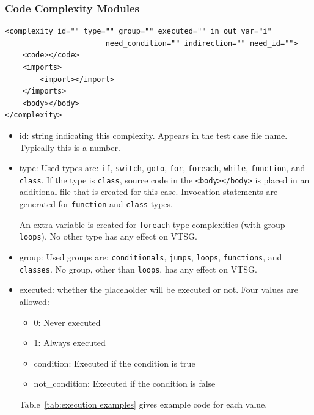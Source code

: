 \subsubsection{Code Complexity Modules}
\label{sec: complexity modules}

\begin{verbatim}
<complexity id="" type="" group="" executed="" in_out_var="i" 
                       need_condition="" indirection="" need_id="">
    <code></code>
    <imports>
        <import></import>
    </imports>
    <body></body>
</complexity>
\end{verbatim}

\begin{itemize}
    \item id: string indicating this complexity.  Appears in the test case
      file name.  Typically this is a number.

    \item type: Used types are: \verb|if|, \verb|switch|, \verb|goto|,
    \verb|for|, \verb|foreach|, \verb|while|,
    \verb|function|, and \verb|class|.
    If the type is \verb|class|, source code in the \verb|<body></body>| is placed in
    an additional file that is created for this case.
    Invocation statements are generated for \verb|function| and \verb|class| types.

    An extra variable is created for \verb|foreach| type complexities (with group
    \verb|loops|).
    No other type has any effect on VTSG.

    \item group: Used groups are: \verb|conditionals|, \verb|jumps|,
    \verb|loops|, \verb|functions|, and \verb|classes|.
    No group, other than \verb|loops|, has any effect on VTSG.

    \item executed: whether the placeholder will be executed or not. Four 
    values are allowed:
    \begin{itemize}[nosep]
        \item 0: Never executed
        \item 1: Always executed
        \item condition:  Executed if the condition is true
        \item not\_condition:  Executed if the condition is false
    \end{itemize}
    Table~\ref{tab:execution examples} gives example code for each value.


\end{itemize}
